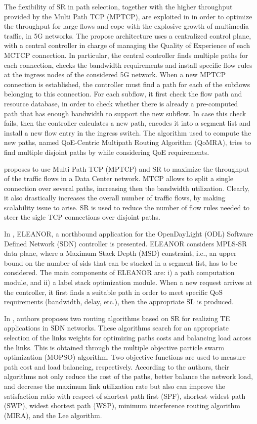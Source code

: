 The flexibility of SR in path selection, together with the higher throughput provided by the Multi Path TCP (MPTCP), are exploited in \cite{barakabitzenovel} in order to optimize the throughput for large flows and cope with the explosive growth of multimedia traffic, in 5G networks.
The propose architecture uses a centralized control plane, with a central controller in charge of managing the Quality of Experience of each MCTCP connection.
In particular, the central controller finds multiple paths for each connection, checks the bandwidth requirements and install specific flow rules at the ingress nodes of the considered 5G network.
When a new MPTCP connection is established, the controller must find a path for each of the subflows belonging to this connection.
For each subflow, it first check the flow path and resource database, in order to check whether there is already a pre-computed path that has enough bandwidth to support the new subflow.
In case this check fails, then the controller calculates a new path, encodes it into a segment list and install a new flow entry in the ingress switch.
The algorithm used to compute the new paths, named QoE-Centric Multipath Routing Algorithm (QoMRA), tries to find multiple disjoint paths by while considering QoE requirements.

\cite{pang2017sdn} proposes to use Multi Path TCP (MPTCP) and SR to maximize the throughput of the traffic flows in a Data Center network. 
MTCP allows to split a single connection over several paths, increasing then the bandwidth utilization.
Clearly, it also drastically increases the overall number of traffic flows, by making scalability issue to arise.
SR is used to reduce the number of flow rules needed to steer the sigle TCP connections over disjoint paths.

In \cite{dugeon2017demonstration}, ELEANOR, a northbound application for the OpenDayLight (ODL) Software Defined Network (SDN) controller is presented.
ELEANOR considers MPLS-SR data plane, where a Maximum Stack Depth (MSD) constraint, i.e., an upper bound on the number of sids that can be stacked in a segment list, has to be considered.
The main components of ELEANOR are: i) a path computation module, and ii) a label stack optimization module.
When a new request arrives at the controller, it first finds a suitable path in order to meet specific QoS requirements (bandwidth, delay, etc.), then the appropriate SL is produced.

In \cite{hou2019optimization}, authors proposes two routing algorithms based on SR for realizing TE applications in SDN networks. These algorithms  search for an appropriate selection of the links weights for optimizing paths costs and balancing load across the links. This is obtained through the multiple objective particle swarm optimization (MOPSO) algorithm. Two objective functions are used to measure path cost and load balancing, respectively.
According to the authors, their algorithms not only reduce the cost of the paths, better balance the network load, and decrease the maximum link utilization rate but also can improve the satisfaction ratio with respect of shortest path first (SPF), shortest widest path (SWP), widest shortest path (WSP), minimum interference routing algorithm (MIRA), and the Lee algorithm.


